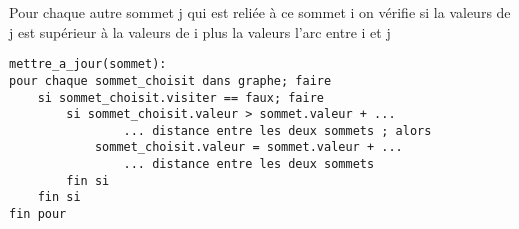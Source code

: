 				Pour chaque autre sommet j qui est reliée à ce sommet i on vérifie si
				la valeurs de j est supérieur à la valeurs de i plus la valeurs l'arc entre i et j

			\begin{lstlisting}
mettre_a_jour(sommet):
pour chaque sommet_choisit dans graphe; faire
	si sommet_choisit.visiter == faux; faire
		si sommet_choisit.valeur > sommet.valeur + ...
				... distance entre les deux sommets ; alors
			sommet_choisit.valeur = sommet.valeur + ...
				... distance entre les deux sommets
		fin si
	fin si
fin pour
			\end{lstlisting}

